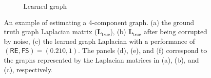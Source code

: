 \begin{figure}[!htb]
\begin{subfigure}[b]{0.3\textwidth}
            \caption{Learned graph}
    \end{subfigure}
        \caption{An example of estimating a 4-component graph. (a) the ground truth graph Laplacian matrix ($\mathbf{L}_{\mathsf{true}}$),
                 (b) $\mathbf{L}_{\mathsf{true}}$ after being corrupted by noise, (c) the learned graph Laplacian with a performance of
                 $(\mathsf{RE}, \mathsf{FS}) = (0.210, 1)$.
                 The panels (d), (e), and (f) correspond to the graphs represented by the Laplacian matrices in
                 (a), (b), and (c), respectively.}\label{fig:4-comp-graph}
        \label{fig:4-comp}
\end{figure}
